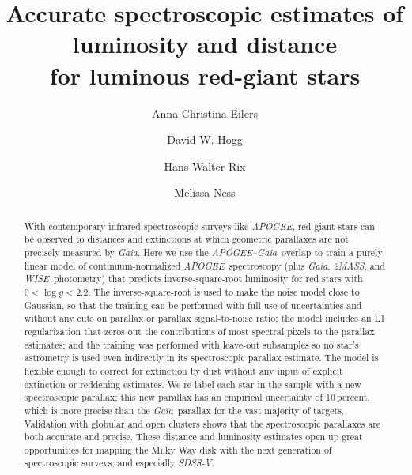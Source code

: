 \documentclass[modern]{aastex62}
\newcommand{\acronym}[1]{{\small{#1}}}
\newcommand{\project}[1]{\textsl{#1}}
\newcommand{\apogee}{\project{\acronym{APOGEE}}}
\newcommand{\gaia}{\project{Gaia}}
\newcommand{\wise}{\project{\acronym{WISE}}}
\newcommand{\zmass}{\project{\acronym{2MASS}}}
\newcommand{\sdssv}{\project{\acronym{SDSS-V}}}
\newcommand{\logg}{\log g}
\begin{document}
\sloppy\sloppypar\raggedbottom\frenchspacing

\title{Accurate spectroscopic estimates of luminosity and distance\\
       for luminous red-giant stars}


\author[0000-0003-2895-6218]{Anna-Christina Eilers}

\author[0000-0003-2866-9403]{David W. Hogg}

\author{Hans-Walter Rix}

\author{Melissa Ness}

\begin{abstract}\noindent
With contemporary infrared spectroscopic surveys like \apogee,
red-giant stars can be observed to distances and extinctions
at which geometric parallaxes are not precisely measured by \gaia.
Here we use the \apogee--\gaia\ overlap to train a purely linear model of
continuum-normalized \apogee\ spectroscopy
(plus \gaia, \zmass, and \wise\ photometry)
that predicts inverse-square-root luminosity for red stars with $0<\logg<2.2$.
The inverse-square-root is used to make the noise model close to Gaussian,
so that the training can be performed with full use of uncertainties and
without any cuts on parallax or parallax signal-to-noise ratio;
the model includes an L1 regularization that zeros out the contributions of
most spectral pixels to the parallax estimates; and the training was performed
with leave-out subsamples so no star's astrometry is used even indirectly in its
spectroscopic parallax estimate.
The model is flexible enough to correct for extinction by dust without any
input of explicit extinction or reddening estimates.
We re-label each star in the sample
with a new spectroscopic parallax; this new parallax has an empirical uncertainty of
10\,percent, which is more precise than the \gaia\ parallax
for the vast majority of targets.
Validation with globular and open clusters shows that the spectroscopic parallaxes
are both accurate and precise.
These distance and luminosity estimates open up great opportunities for
mapping the Milky Way disk with the next
generation of spectroscopic surveys, and especially \sdssv.
\end{abstract}
\end{document}
